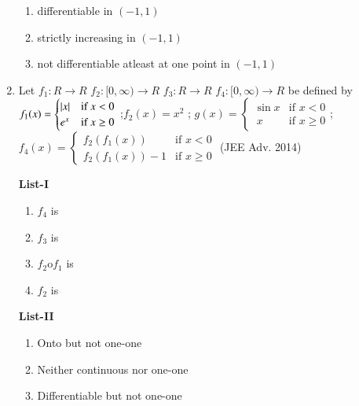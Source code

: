 \documentclass[journal,12pt,twocolumn]{IEEEtran}
\theoremstyle{remark}
\begin{document}
\begin{enumerate}
\begin{multicols}{2}
\begin{enumerate}
					\item differentiable in $(-1,1)$

					\item strictly increasing in $(-1,1)$

					\item  not differentiable atleast at one point in  $(-1,1)$
				\end{enumerate}
			\end{multicols}
		\item Let $f_1:R\rightarrow R$ $f_2:[0,\infty)\rightarrow R$ $f_3:R\rightarrow R$ $f_4:[0,\infty)\rightarrow R$ be defined by
		$f_1(x)=
        \begin{cases}
		\left\vert x\right\vert & \text{if } x < 0 \\
                 e^x & \text{if } x \geq 0 
                 \end{cases}$
		 ;$f_2(x)=x^2$ ;
		 $g(x) =
                 \begin{cases}
			 \sin{x} & \text{if }  x < 0 \\
                    \ x & \text{if }  x\geq 0
                  \end{cases}$;
	        $f_4(x) =
                  \begin{cases}
                     f_2(f_1(x)) & \text{if } x < 0 \\
                     f_2(f_1(x))-1 & \text{if } x \geq 0 
                  \end{cases}$
                  \hfill(JEE Adv. 2014)
                 \begin{multicols}{2} 
				\textbf{List-I} 
				\begin{enumerate}[label=\Alph*., start=16]
					\item $f_4$ is
					\item $f_3$ is 
					\item $f_2$o$f_1$ is 
					\item $f_2$ is
				\end{enumerate}
				\columnbreak
				\textbf{List-II}
				\begin{enumerate}[label=\arabic*.]
					\item  Onto but not one-one 

					\item  Neither continuous nor one-one 

					\item  Differentiable but not one-one 


\end{enumerate}
\end{multicols}
\end{enumerate}
\end{document}

